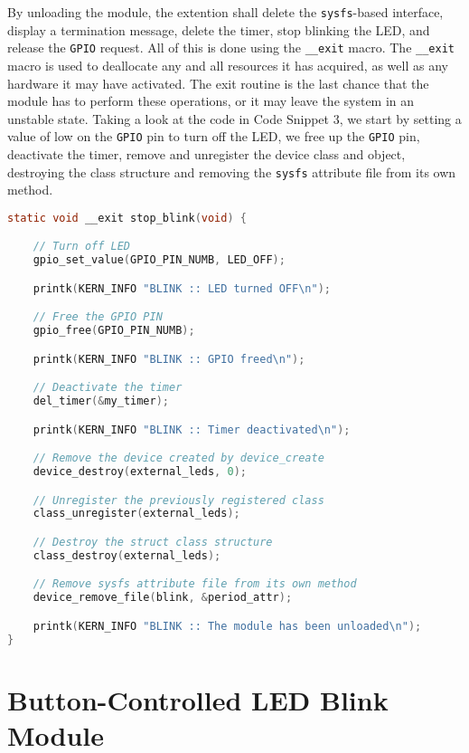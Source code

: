 \documentclass[a4paper,oneside,onecolumn]{article}
\newcommand{\code}[1]{\colorbox{codegray}{\texttt{#1}}}
\begin{document}
By unloading the module, the extention shall delete the \texttt{sysfs}-based interface, display a termination message, delete the timer, stop blinking the LED, and release the \texttt{GPIO} request. All of this is done using the \code{\_\_exit} macro. The \code{\_\_exit} macro is used to deallocate any and all resources it has acquired, as well as any hardware it may have activated. The exit routine is the last chance that the module has to perform these operations, or it may leave the system in an unstable state.
\newline
\newline
Taking a look at the code in Code Snippet 3, we start by setting a value of low on the \texttt{GPIO} pin to turn off the LED, we free up the \texttt{GPIO} pin, deactivate the timer, remove and unregister the device class and object, destroying the class structure and removing the \texttt{sysfs} attribute file from its own method.

\begin{lstlisting}[language=c, label={lst:exit}, caption={Unloading of the Module}]
static void __exit stop_blink(void) {

    // Turn off LED
    gpio_set_value(GPIO_PIN_NUMB, LED_OFF);

    printk(KERN_INFO "BLINK :: LED turned OFF\n");

    // Free the GPIO PIN
    gpio_free(GPIO_PIN_NUMB);

    printk(KERN_INFO "BLINK :: GPIO freed\n");

    // Deactivate the timer
    del_timer(&my_timer);

    printk(KERN_INFO "BLINK :: Timer deactivated\n");

    // Remove the device created by device_create
    device_destroy(external_leds, 0);

    // Unregister the previously registered class
    class_unregister(external_leds);

    // Destroy the struct class structure
    class_destroy(external_leds);

    // Remove sysfs attribute file from its own method
    device_remove_file(blink, &period_attr);

    printk(KERN_INFO "BLINK :: The module has been unloaded\n");
}
\end{lstlisting}

\section{Button-Controlled LED Blink Module}
\end{document}
